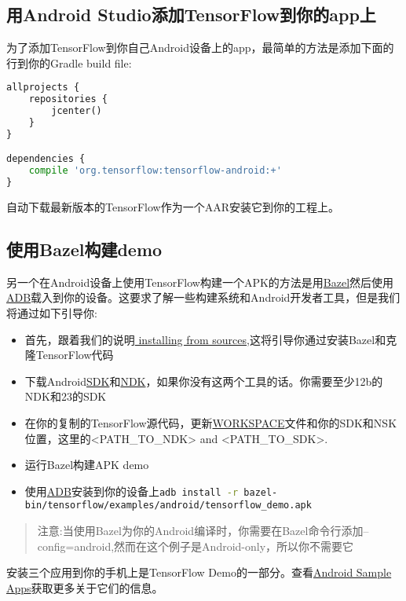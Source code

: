 \subsection{用Android Studio添加TensorFlow到你的app上}
为了添加TensorFlow到你自己Android设备上的app，最简单的方法是添加下面的行到你的Gradle build file:
\begin{lstlisting}[language=Python]
allprojects {
    repositories {
        jcenter()
    }
}

dependencies {
    compile 'org.tensorflow:tensorflow-android:+'
}

\end{lstlisting}
自动下载最新版本的TensorFlow作为一个AAR安装它到你的工程上。
\subsection{使用Bazel构建demo}\label{subseq:Bazel构建}
另一个在Android设备上使用TensorFlow构建一个APK的方法是用\href{https://bazel.build/}{Bazel}然后使用\href{https://developer.android.com/studio/command-line/adb.html?hl=zh-cn}{ADB}载入到你的设备。这要求了解一些构建系统和Android开发者工具，但是我们将通过如下引导你:
\begin{itemize}
\item 首先，跟着我们的说明\href{https://www.tensorflow.org/install/install_sources?hl=zh-cn}{ installing from sources},这将引导你通过安装Bazel和克隆TensorFlow代码
\item 下载Android\href{https://developer.android.com/studio/index.html?hl=zh-cn}{SDK}和\href{https://developer.android.com/ndk/downloads/index.html?hl=zh-cn}{NDK}，如果你没有这两个工具的话。你需要至少12b的NDK和23的SDK
\item 在你的复制的TensorFlow源代码，更新\href{https://github.com/tensorflow/tensorflow/blob/master/WORKSPACE}{WORKSPACE}文件和你的SDK和NSK位置，这里的<PATH\_TO\_NDK> and <PATH\_TO\_SDK>.
\item 运行Bazel构建APK demo 
\item 使用\href{https://developer.android.com/studio/command-line/adb.html?hl=zh-cn#move}{ADB}安装到你的设备上\lstinline[language=Bash]{adb install -r bazel-bin/tensorflow/examples/android/tensorflow_demo.apk}
\end{itemize}
\begin{quote}
注意:当使用Bazel为你的Android编译时，你需要在Bazel命令行添加--config=android,然而在这个例子是Android-only，所以你不需要它
\end{quote}
安装三个应用到你的手机上是TensorFlow Demo的一部分。查看\href{https://www.tensorflow.org/mobile/android_build?hl=zh-cn#android_sample_apps}{Android Sample Apps}获取更多关于它们的信息。
